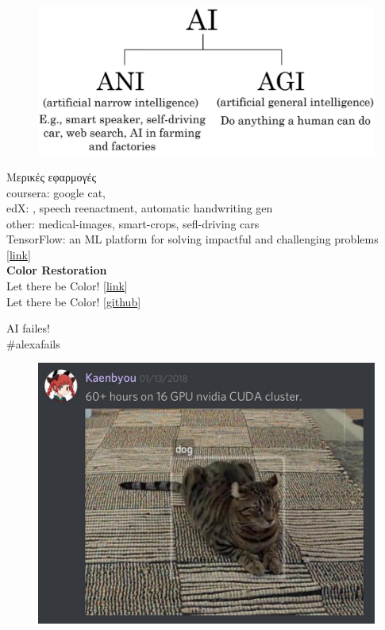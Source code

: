 \documentclass[10pt, compress]{beamer}
\begin{document}
\begin{frame}
  \begin{figure}
    \includegraphics[width=.9\linewidth]{imgs/ai_for_everyone_course/2}
  \end{figure}
\end{frame}

\begin{frame}

  Μερικές εφαρμογές \\
  coursera: google cat,  \\
  edX: , speech reenactment, automatic handwriting gen \\
  other:  medical-images, smart-crops, sefl-driving cars \\

  TensorFlow: an ML platform for solving impactful and challenging problems [\href{https://www.youtube.com/watch?v=NlpS-DhayQA}{link}] \\
  \textbf{Color Restoration} \\
  Let there be Color! [\href{http://iizuka.cs.tsukuba.ac.jp/projects/colorization/extra.html}{link}] \\
  Let there be Color! [\href{https://github.com/satoshiiizuka/siggraph2016_colorization}{github}]
\end{frame}

\begin{frame}
AI failes!\\
\#alexafails
\end{frame}

\begin{frame}
  \vspace{.6cm}
  \begin{figure}
    \includegraphics[width=.9\linewidth]{imgs/funny_1}
  \end{figure}
\end{frame}
\end{document}
